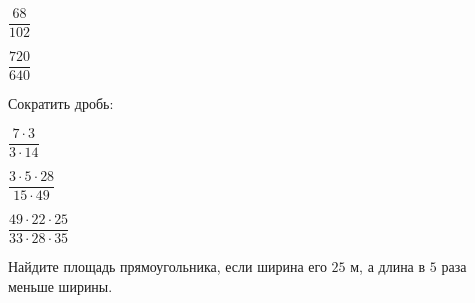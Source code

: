 \begin{listofex}
\begin{enumcols}[itemcolumns=6]
		\item \(\dfrac{68}{102} \)
		\item \(\dfrac{720}{640} \)
	\end{enumcols}
	\item Сократить дробь:
	\begin{enumcols}[itemcolumns=3]
		\item \(\dfrac{7 \cdot 3}{3 \cdot 14}\)
		\item \(\dfrac{3 \cdot 5 \cdot 28}{15 \cdot 49} \)
		\item \(\dfrac{49 \cdot 22 \cdot 25}{33 \cdot 28 \cdot 35} \)
	\end{enumcols}
	\item Найдите площадь прямоугольника, если ширина его \( 25 \) м, а длина в \( 5 \) раза меньше ширины.
\end{listofex}
%	
%	
%	
%	
%	
%	
